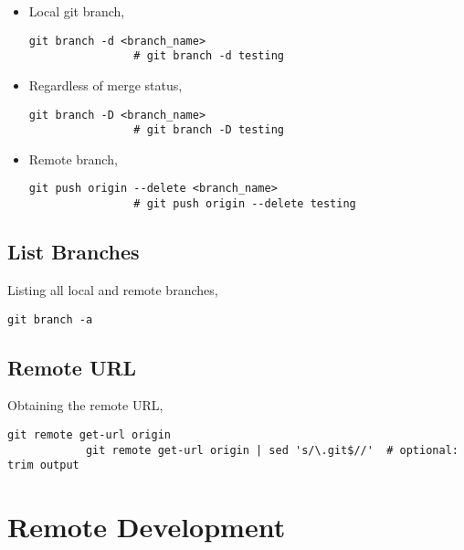 \documentclass[12pt, a4paper]{article}
\numberwithin{equation}{section}
\theoremstyle{definition}
\theoremstyle{definition}
\begin{document}
		\begin{itemize}
			\item Local git branch,
			
			\begin{lstlisting}[style=mystylebash, label=alg:git_delete_branch, xleftmargin=\parindent]
				git branch -d <branch_name>
				# git branch -d testing
			\end{lstlisting}
		
			\item Regardless of merge status,
			
			\begin{lstlisting}[style=mystylebash, label=alg:git_delete_branch__force, xleftmargin=\parindent]
				git branch -D <branch_name>
				# git branch -D testing
			\end{lstlisting}
		
			\item Remote branch,
			
			\begin{lstlisting}[style=mystylebash, label=alg:git_delete_branch__remote, xleftmargin=\parindent]
				git push origin --delete <branch_name>
				# git push origin --delete testing
			\end{lstlisting}
		\end{itemize}
	
	\subsection{List Branches}
		Listing all local and remote branches, 

		\begin{lstlisting}[style=mystylebash, label=alg:git_list_branches, xleftmargin=\parindent]
			git branch -a
		\end{lstlisting}
	
	\subsection{Remote URL}
		Obtaining the remote URL, 
		
		\begin{lstlisting}[style=mystylebash, label=alg:git__remote_url, xleftmargin=\parindent]
			git remote get-url origin 
			git remote get-url origin | sed 's/\.git$//'  # optional: trim output
		\end{lstlisting}
		
	\newpage 
	
	\section{Remote Development}
	
\end{document}
